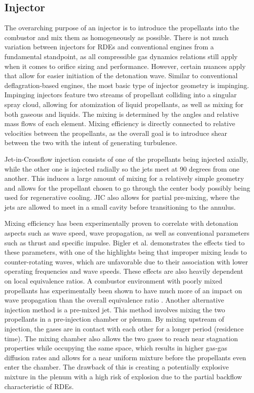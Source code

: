 \subsection{Injector}

The overarching purpose of an injector is to introduce the propellants into the combustor and mix them as homogeneously as possible. There is not much variation between injectors for RDEs and conventional engines from a fundamental standpoint, as all compressible gas dynamics relations still apply when it comes to orifice sizing and performance. However, certain nuances apply that allow for easier initiation of the detonation wave. Similar to conventional deflagration-based engines, the most basic type of injector geometry is impinging. Impinging injectors feature two streams of propellant colliding into a singular spray cloud, allowing for atomization of liquid propellants, as well as mixing for both gaseous and liquids. The mixing is determined by the angles and relative mass flows of each element. Mixing efficiency is directly connected to relative velocities between the propellants, as the overall goal is to introduce shear between the two with the intent of generating turbulence.

Jet-in-Crossflow injection consists of one of the propellants being injected axially, while the other one is injected radially so the jets meet at 90 degrees from one another. This induces a large amount of mixing for a relatively simple geometry and allows for the propellant chosen to go through the center body possibly being used for regenerative cooling. JIC also allows for partial pre-mixing, where the jets are allowed to meet in a small cavity before transitioning to the annulus.

Mixing efficiency has been experimentally proven to correlate with detonation aspects such as wave speed, wave propagation, as well as conventional parameters such as thrust and specific impulse. Bigler et al. \cite{bigler:2019} demonstrates the effects tied to these parameters, with one of the highlights being that improper mixing leads to counter-rotating waves, which are unfavorable due to their association with lower operating frequencies and wave speeds. These effects are also heavily dependent on local equivalence ratios. A combustor environment with poorly mixed propellants has experimentally been shown to have much more of an impact on wave propagation than the overall equivalence ratio \cite{bigler:2019}. Another alternative injection method is a pre-mixed jet. This method involves mixing the two propellants in a pre-injection chamber or plenum. By mixing upstream of injection, the gases are in contact with each other for a longer period (residence time). The mixing chamber also allows the two gases to reach near stagnation properties while occupying the same space, which results in higher gas-gas diffusion rates and allows for a near uniform mixture before the propellants even enter the chamber. The drawback of this is creating a potentially explosive mixture in the plenum with a high risk of explosion due to the partial backflow characteristic of RDEs.

